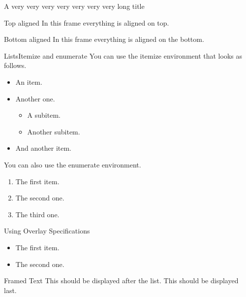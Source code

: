 \documentclass[final]{beamer}
\begin{document}
\begin{frame}{A very very very very very very very long title}

\end{frame}
%
%
%
%
%
\begin{frame}[t]{Top aligned}
In this frame everything is aligned on top.
\end{frame}
%
%
%
%
%
\begin{frame}[b]{Bottom aligned}
In this frame everything is aligned on the bottom.
\end{frame}
%
%
%
%
%
\begin{frame}{Lists}{Itemize and enumerate}
You can use the itemize environment that looks as follows.
\begin{itemize}
\item An item.
\item Another one.
\begin{itemize}
\item A subitem.
\item Another subitem.
\end{itemize}
\item And another item.
\end{itemize}
%
\vfill%
You can also use the enumerate environment.
\begin{enumerate}
\item The first item.
\item The second one.
\item The third one.
\end{enumerate}
\end{frame}

\begin{frame}{Using Overlay Specifications}
\begin{itemize}[<+(1)->]
\item The first item.
\item The second one.
\end{itemize}
\pause
\begin{block}{Framed Text}
This should be displayed after the list.
\pause
This should be displayed last.
\end{block}
\end{frame}
%
%
%
%
%
\end{document}
